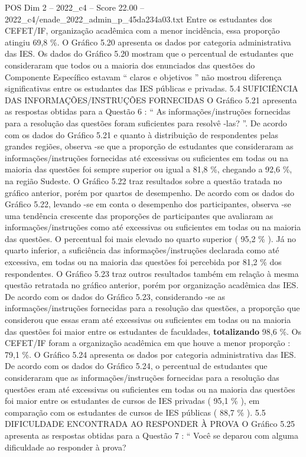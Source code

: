 \begin{textsample}{POS Dim 2 – 2022\_c4 – Score 22.00 – 2022\_c4/enade\_2022\_admin\_p\_45da234a03.txt}
Entre os estudantes dos CEFET/IF, organização acadêmica com a menor incidência, essa proporção atingiu 69,8 \%.
O Gráfico 5.20 apresenta os dados por categoria administrativa das IES.
Os dados do Gráfico 5.20 mostram que o percentual de estudantes que consideraram que todos ou a maioria dos enunciados das questões do Componente Específico estavam “ claros e objetivos ” não mostrou diferença significativas entre os estudantes das IES públicas e privadas. 5.4 SUFICIÊNCIA DAS INFORMAÇÕES/INSTRUÇÕES FORNECIDAS O Gráfico 5.21 apresenta as respostas obtidas para a Questão 6 : “ As informações/instruções fornecidas para a resolução das questões foram suficientes para resolvê -las? ”.
De acordo com os dados do Gráfico 5.21 e quanto à distribuição de respondentes pelas grandes regiões, observa -se que a proporção de estudantes que consideraram as informações/instruções fornecidas até excessivas ou suficientes em todas ou na maioria das questões foi sempre superior ou igual a 81,8 \%, chegando a 92,6 \%, na região Sudeste.
O Gráfico 5.22 traz resultados sobre a questão tratada no gráfico anterior, porém por quartos de desempenho.
De acordo com os dados do Gráfico 5.22, levando -se em conta o desempenho dos participantes, observa -se uma tendência crescente das proporções de participantes que avaliaram as informações/instruções como até excessivas ou suficientes em todas ou na maioria das questões.
O percentual foi mais elevado no quarto superior ( 95,2 \% ).
Já no quarto inferior, a suficiência das informações/instruções declarada como até excessiva, em todas ou na maioria das questões foi percebida por 81,2 \% dos respondentes.
O Gráfico 5.23 traz outros resultados também em relação à mesma questão retratada no gráfico anterior, porém por organização acadêmica das IES.
De acordo com os dados do Gráfico 5.23, considerando -se as informações/instruções fornecidas para a resolução das questões, a proporção que considerou que essas eram até excessivas ou suficientes em todas ou na maioria das questões foi maior entre os estudantes de faculdades, \textbf{totalizando} 98,6 \%.
Os CEFET/IF foram a organização acadêmica em que houve a menor proporção : 79,1 \%.
O Gráfico 5.24 apresenta os dados por categoria administrativa das IES.
De acordo com os dados do Gráfico 5.24, o percentual de estudantes que consideraram que as informações/instruções fornecidas para a resolução das questões eram até excessivas ou suficientes em todas ou na maioria das questões foi maior entre os estudantes de cursos de IES privadas ( 95,1 \% ), em comparação com os estudantes de cursos de IES públicas ( 88,7 \% ). 5.5 DIFICULDADE ENCONTRADA AO RESPONDER À PROVA O Gráfico 5.25 apresenta as respostas obtidas para a Questão 7 : “ Você se deparou com alguma dificuldade ao responder à prova?

\end{textsample}
